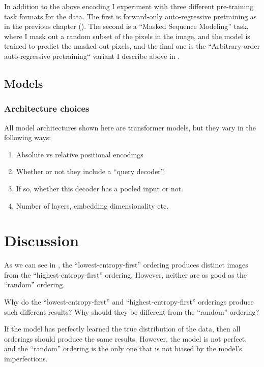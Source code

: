 In addition to the above encoding I experiment with three different pre-training task formats for the data. The first is forward-only auto-regressive pretraining as in the previous chapter (). The second is a ``Masked Sequence Modeling'' task, where I mask out a random subset of the pixels in the image, and the model is trained to predict the masked out pixels, and the final one is the ``Arbitrary-order auto-regressive pretraining`` variant I describe above in .

\subsection{Models}

\subsubsection{Architecture choices}

All model architectures shown here are transformer models, but they vary in the following ways:

\begin{enumerate}
    \item Absolute vs relative positional encodings
    \item Whether or not they include a ``query decoder''.
    \item If so, whether this decoder has a pooled input or not.
    \item Number of layers, embedding dimensionality etc.
\end{enumerate}



\section{Discussion}
\label{s:a-o-discussion}

As we can see in , the ``lowest-entropy-first'' ordering produces distinct images from the ``highest-entropy-first'' ordering. However, neither are as good as the ``random'' ordering.

Why do the ``lowest-entropy-first'' and ``highest-entropy-first'' orderings produce such different results? Why should they be different from the ``random'' ordering?

If the model has perfectly learned the true distribution of the data, then all orderings should produce the same results. However, the model is not perfect, and the ``random'' ordering is the only one that is not biased by the model's imperfections.

